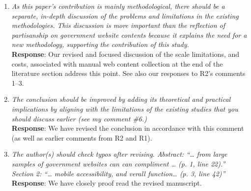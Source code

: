 \documentclass[12pt,titlepage]{article}
\begin{document}
\begin{enumerate}
    \item \emph{As this paper’s contribution is mainly methodological, there should be a separate, in-depth discussion of the problems and limitations in the existing methodologies. This discussion is more important than the reflection of partisanship on government website contents because it explains the need for a new methodology, supporting the contribution of this study.}\\

    \textbf{Response}:  Our revised and focused discussion of the scale limitations, and costs, associated with manual web content collection at the end of the literature section address this point. See also our responses to R2's comments 1--3.
    
        \item \emph{The conclusion should be improved by adding its theoretical and practical implications by aligning with the limitations of the existing studies that you should discuss earlier (see my comment \#6.)}\\

    \textbf{Response}:  We have revised the conclusion in accordance with this comment (as well as earlier comments from R2 and R1). 
    
    
            \item \emph{The author(s) should check typos after revising. Abstract: “… from large samples of government websites can can compliment … (p. 1, line 22).” Section 2: “… mobile accessibility, and verall function… (p. 3, line 42)”}\\

    \textbf{Response}: We have closely proof read the revised manuscript.


    

\end{enumerate}





\newpage
\singlespacing
%
% 
\end{document}
